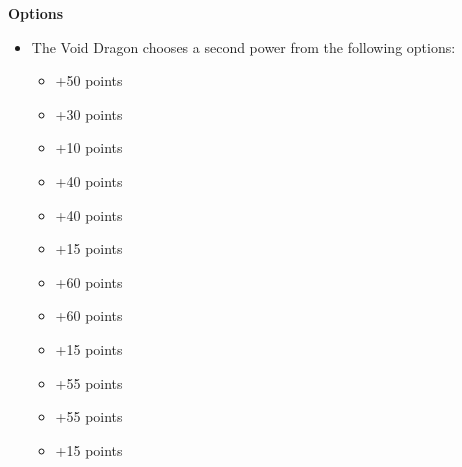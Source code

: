 \begin{minipage}[t]{0.72\textwidth}
	\vspace*{2em}
	\textbf{Options}
	\begin{itemize}
		\item The Void Dragon chooses a second power from the following options:
		\begin{itemize}
			\item {} \dotfill +50 points
			\item {} \dotfill +30 points
			\item {} \dotfill +10 points
			\item {} \dotfill +40 points
			\item {} \dotfill +40 points
			\item {} \dotfill +15 points
			\item {} \dotfill +60 points
			\item {} \dotfill +60 points
			\item {} \dotfill +15 points
			\item {} \dotfill +55 points
			\item {} \dotfill +55 points
			\item {} \dotfill +15 points
		\end{itemize}
	\end{itemize}
\end{minipage}
\hspace{0.5em}


\newpage
\subsubsection[C'tan Shard of Tsara'noga, the Outsider]{}


